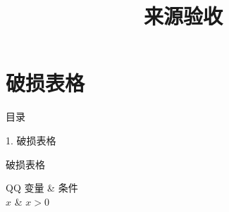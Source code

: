 \documentclass[aspectratio=169,10pt,fontset=fandol]{ctexbeamer}
\title{来源验收}
\begin{document}
\section{破损表格}
\begin{frame}[t,fragile]{目录}
\normalsize
{\color{blue}\normalsize 1. 破损表格\par}\vspace{0.22em}
\end{frame}
\begin{frame}[t,fragile]{破损表格}
\normalsize
{\normalsize
\begin{table}
\begin{tabularx}{\linewidth}{QQ}
变量 & 条件 \\
$x$ & $x>0$ \\
\end{tabularx}
\end{table}
}
\end{frame}
\end{document}

